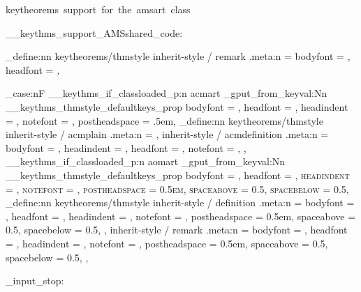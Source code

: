   {keytheorems~support~for~the~amsart~class}

\__keythms_support_AMSshared_code:

\keys_define:nn { keytheorems/thmstyle }
  {
    inherit-style / remark .meta:n =
      {
        bodyfont = \normalfont,
        headfont = \itshape,
      }
  }

\bool_case:nF
  {
    { \__keythms_if_classloaded_p:n { acmart } }
      {
        \prop_gput_from_keyval:Nn \g__keythms_thmstyle_defaultkeys_prop
          {
            bodyfont      = \@acmplainbodyfont,
            headfont      = \@acmplainheadfont,
            headindent    = \@acmplainindent,
            notefont      = \@acmplainnotefont,
            postheadspace = .5em,
          }
        \keys_define:nn { keytheorems/thmstyle }
          {
            inherit-style / acmplain      .meta:n = {},
            inherit-style / acmdefinition .meta:n =
              {
                bodyfont   = \@acmdefinitionbodyfont,
                headindent = \@acmdefinitionindent,
                headfont   = \@acmdefinitionheadfont,
                notefont   = \@acmdefinitionnotefont,
              },
          }
      }
    { \__keythms_if_classloaded_p:n { aomart } }
      {
        \prop_gput_from_keyval:Nn \g__keythms_thmstyle_defaultkeys_prop
          {
            bodyfont      = \sishape,
            headfont      = \scshape,
            headindent    = \parindent,
            notefont      = \normalfont,
            postheadspace = 0.5em,
            spaceabove    = 0.5\linespacing,
            spacebelow    = 0.5\linespacing,
          }
        \keys_define:nn { keytheorems/thmstyle }
          {
            inherit-style / definition .meta:n =
              {
                bodyfont      = \upshape,
                headfont      = \sishape,
                headindent    = \parindent,
                notefont      = \normalfont,
                postheadspace = 0.5em,
                spaceabove    = 0.5\linespacing,
                spacebelow    = 0.5\linespacing,
              },
            inherit-style / remark .meta:n =
              {
                bodyfont      = \upshape,
                headfont      = \sishape,
                headindent    = \parindent,
                notefont      = \normalfont,
                postheadspace = 0.5em,
                spaceabove    = 0.5\linespacing,
                spacebelow    = 0.5\linespacing,
              },
          }
      }
  }

\file_input_stop: